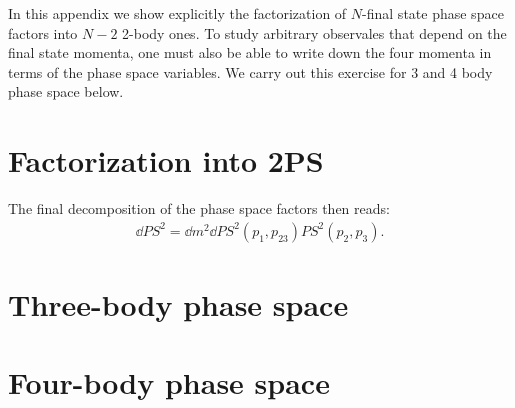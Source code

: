 In this appendix we show explicitly the factorization of $N$-final state phase space factors into $N-2$ 2-body ones. To study arbitrary observales that depend on the final state momenta, one must also be able to write down the four momenta in terms of the phase space variables. We carry out this exercise for 3 and 4 body phase space below.

\section{Factorization into 2PS}

The final decomposition of the phase space factors then reads:
\begin{align}
 \dd PS^2 = \dd m^2 \dd PS^2 (p_1, p_23) PS^2 (p_2,p_3).
\end{align}


\section{Three-body phase space}



\section{Four-body phase space}




